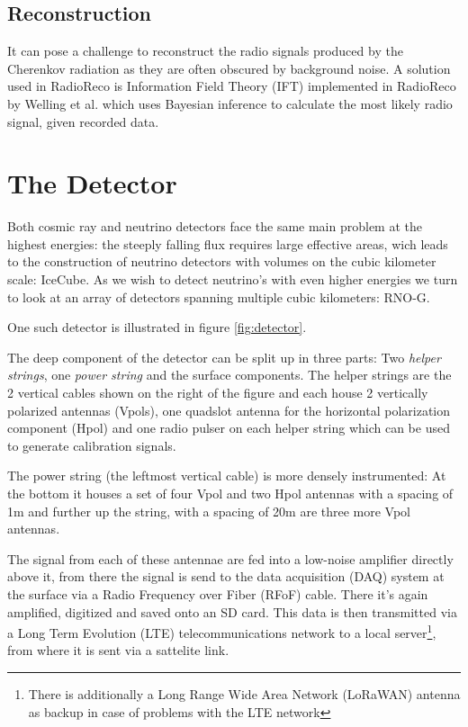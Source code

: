\documentclass[11pt,a4paper,faculty=we,language=en,doctype=report]{cls/ugent-doc}
\begin{document}
\section{Reconstruction}
It can pose a challenge to reconstruct the radio signals produced by the Cherenkov radiation as they are often obscured by background noise. A solution used in RadioReco is Information Field Theory (IFT) implemented in RadioReco by Welling et al.\cite{Welling_2021} which uses Bayesian inference to calculate the most likely radio signal, given recorded data.
\chapter{The Detector}
Both cosmic ray and neutrino detectors face the same main problem at the highest energies: the steeply falling flux requires large effective areas, wich leads to the construction of neutrino detectors with volumes on the cubic kilometer scale: IceCube. As we wish to detect neutrino's with even higher energies we turn to look at an array of detectors spanning multiple cubic kilometers: RNO-G.

One such detector is illustrated in figure \ref{fig:detector}.

The deep component of the detector can be split up in three parts: Two \textit{helper strings}, one \textit{power string} and the surface components. The helper strings are the 2 vertical cables shown on the right of the figure and each house 2 vertically polarized antennas (Vpols), one quadslot antenna for the horizontal polarization component (Hpol) and one radio pulser on each helper string which can be used to generate calibration signals.

The power string (the leftmost vertical cable) is more densely instrumented: At the bottom it houses a set of four Vpol and two Hpol antennas with a spacing of 1m and further up the string, with a spacing of 20m are three more Vpol antennas.

The signal from each of these antennae are fed into a low-noise amplifier directly above it, from there the signal is send to the data acquisition (DAQ) system at the surface via a Radio Frequency over Fiber (RFoF) cable. There it's again amplified, digitized and saved onto an SD card. This data is then transmitted via a Long Term Evolution (LTE) telecommunications network to a local server\footnote{There is additionally a Long Range Wide Area Network (LoRaWAN) antenna as backup in case of problems with the LTE network}, from where it is sent via a sattelite link.
\end{document}
